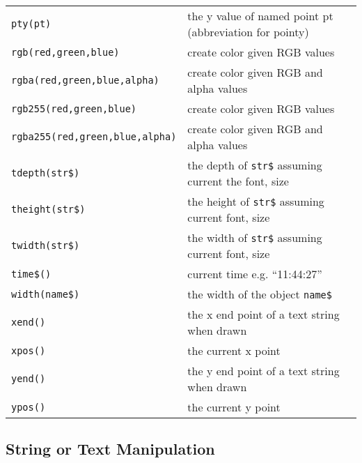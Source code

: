 \begin{supertabular}{ll}
{\tt pty(pt)}          	& the y value of named point pt (abbreviation for pointy)\\
{\tt rgb(red,green,blue)}   & create color given RGB values \\
{\tt rgba(red,green,blue,alpha)}   & create color given RGB and alpha values \\
{\tt rgb255(red,green,blue)}   & create color given RGB values \\
{\tt rgba255(red,green,blue,alpha)}   & create color given RGB and alpha values \\
{\tt tdepth(str\$)}  	& the depth of {\tt str\$} assuming current the font, size \\
{\tt theight(str\$)}   & the height of {\tt str\$} assuming  current font, size \\
{\tt twidth(str\$)}  	& the width of {\tt str\$} assuming current font, size \\
{\tt time\$()}       	& current time e.g. ``11:44:27'' \\
{\tt width(name\$)}  	& the width of the object {\tt name\$} \\
{\tt xend()}           	& the x end point of a text string when drawn \\
{\tt xpos()}           	& the current x point \\
{\tt yend()}           	& the y end point of a text string when drawn \\
{\tt ypos()}           	& the current y point \\
\end{supertabular}


\subsection{String or Text Manipulation}

